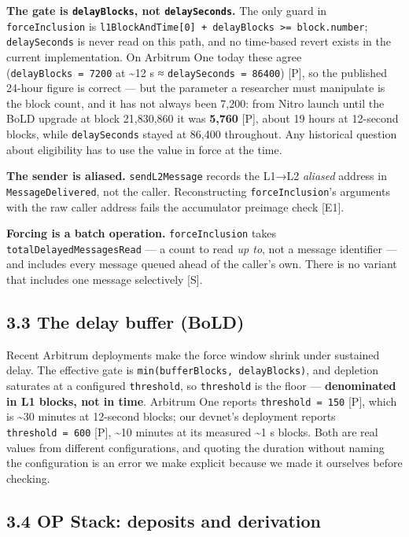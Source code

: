 \documentclass[conference]{IEEEtran}
\renewcommand{\_}{\textunderscore\allowbreak}
\begin{document}
\textbf{The gate is \texttt{delayBlocks}, not \texttt{delaySeconds}.}
The only guard in \texttt{forceInclusion} is
\texttt{l1BlockAndTime{[}0{]}\ +\ delayBlocks\_\ \textgreater{}=\ block.number};
\texttt{delaySeconds} is never read on this path, and no time-based
revert exists in the current implementation. On Arbitrum One today these
agree (\texttt{delayBlocks\ =\ 7200} at \textasciitilde12 s ≈
\texttt{delaySeconds\ =\ 86400}) {[}P{]}, so the published 24-hour
figure is correct --- but the parameter a researcher must manipulate is
the block count, and it has not always been 7,200: from Nitro launch
until the BoLD upgrade at block 21,830,860 it was \textbf{5,760}
{[}P{]}, about 19 hours at 12-second blocks, while \texttt{delaySeconds}
stayed at 86,400 throughout. Any historical question about eligibility
has to use the value in force at the time.

\textbf{The sender is aliased.} \texttt{sendL2Message} records the L1→L2
\emph{aliased} address in \texttt{MessageDelivered}, not the caller.
Reconstructing \texttt{forceInclusion}'s arguments with the raw caller
address fails the accumulator preimage check {[}E1{]}.

\textbf{Forcing is a batch operation.} \texttt{forceInclusion} takes
\texttt{\_totalDelayedMessagesRead} --- a count to read \emph{up to},
not a message identifier --- and includes every message queued ahead of
the caller's own. There is no variant that includes one message
selectively {[}S{]}.

\subsection{3.3 The delay buffer (BoLD)}\label{the-delay-buffer-bold}

Recent Arbitrum deployments make the force window shrink under sustained
delay. The effective gate is \texttt{min(bufferBlocks,\ delayBlocks)},
and depletion saturates at a configured \texttt{threshold}, so
\texttt{threshold} is the floor --- \textbf{denominated in L1 blocks,
not in time}. Arbitrum One reports \texttt{threshold\ =\ 150} {[}P{]},
which is \textasciitilde30 minutes at 12-second blocks; our devnet's
deployment reports \texttt{threshold\ =\ 600} {[}P{]}, \textasciitilde10
minutes at its measured \textasciitilde1 s blocks. Both are real values
from different configurations, and quoting the duration without naming
the configuration is an error we make explicit because we made it
ourselves before checking.

\subsection{3.4 OP Stack: deposits and
derivation}\label{op-stack-deposits-and-derivation}
\end{document}
